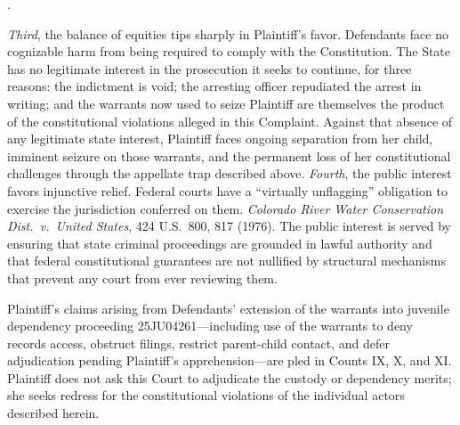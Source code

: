 \documentclass[12pt,letterpaper]{article}
\newcounter{complaintpara}
\newenvironment{paras}{%
	\begin{list}{\arabic{complaintpara}.}{%
			\setlength{\leftmargin}{0.5in}%
			\setlength{\labelwidth}{0.4in}%
			\setlength{\labelsep}{0.1in}%
			\setlength{\itemsep}{0pt}%
			\setlength{\parsep}{0pt}%
			\setlength{\topsep}{6pt}%
		}%
	}{%
	\end{list}%
}
\begin{document}
\begin{paras}
		\item \textit{Third}, the balance of
		equities tips sharply in Plaintiff's favor. Defendants face no cognizable harm from being required to comply with the Constitution. The State has no legitimate interest in the prosecution it seeks to continue, for three reasons: the indictment is void; the arresting officer repudiated the arrest in writing; and the warrants now used to seize Plaintiff are themselves the product of the constitutional violations alleged in this Complaint. Against that absence of any legitimate state interest, Plaintiff faces ongoing separation from her child, imminent seizure on those warrants, and the permanent loss of her constitutional challenges through the appellate trap described above.
		\textit{Fourth}, the public interest favors injunctive relief.
		Federal courts have a ``virtually unflagging'' obligation to exercise
		the jurisdiction conferred on them. \textit{Colorado River Water
			Conservation Dist.\ v.\ United States}, 424 U.S.\ 800, 817 (1976).
		The public interest is served by ensuring that state criminal
		proceedings are grounded in lawful authority and that federal
		constitutional guarantees are not nullified by structural mechanisms
		that prevent any court from ever reviewing them.
		\item Plaintiff's claims arising from Defendants' extension of the
		warrants into juvenile dependency proceeding 25JU04261---including
		use of the warrants to deny records access, obstruct filings,
		restrict parent-child contact, and defer adjudication pending
		Plaintiff's apprehension---are pled in Counts IX, X, and XI. Plaintiff
		does not ask this Court to adjudicate the custody or dependency
		merits; she seeks redress for the constitutional violations of the
		individual actors described herein.
		
	\end{paras}
\end{document}
